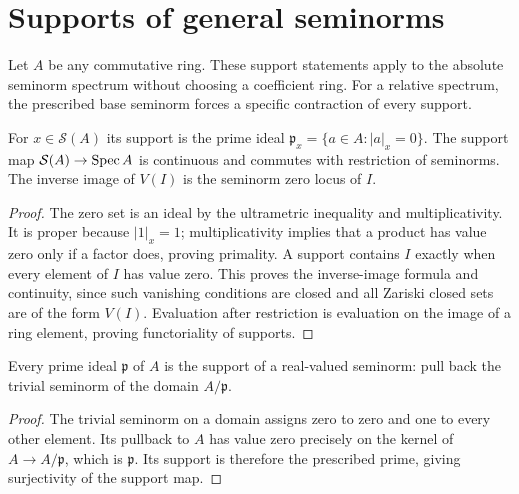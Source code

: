 \section{Supports of general seminorms}\label{sec:general-supports}

Let $A$ be any commutative ring. These support statements apply to the absolute
seminorm spectrum without choosing a coefficient ring. For a relative spectrum,
the prescribed base seminorm forces a specific contraction of every support.

\begin{definition}\label{spectrum:support}
\leanok
{}
For $x\in\mathcal S(A)$ its support is the prime ideal
$\mathfrak p_x=\{a\in A:|a|_x=0\}$. The support map
$\mathcal S(A)\to\operatorname{Spec} A$ is continuous and commutes with restriction of seminorms.
The inverse image of $V(I)$ is the seminorm zero locus of $I$.
\end{definition}
\begin{proof}
The zero set is an ideal by the ultrametric inequality and multiplicativity.
It is proper because $|1|_x=1$; multiplicativity implies that a product has value
zero only if a factor does, proving primality. A support contains $I$ exactly when
every element of $I$ has value zero. This proves the inverse-image formula and
continuity, since such vanishing conditions are closed and all Zariski closed
sets are of the form $V(I)$. Evaluation after restriction is evaluation on the
image of a ring element, proving functoriality of supports.
\end{proof}

\begin{lemma}\label{spectrum:support-surjective}
\leanok
{}
Every prime ideal $\mathfrak p$ of $A$ is the support of a real-valued seminorm:
pull back the trivial seminorm of the domain $A/\mathfrak p$.
\end{lemma}
\begin{proof}
The trivial seminorm on a domain assigns zero to zero and one to every other
element. Its pullback to $A$ has value zero precisely on the kernel of
$A\to A/\mathfrak p$, which is $\mathfrak p$. Its support is therefore the
prescribed prime, giving surjectivity of the support map.
\end{proof}

